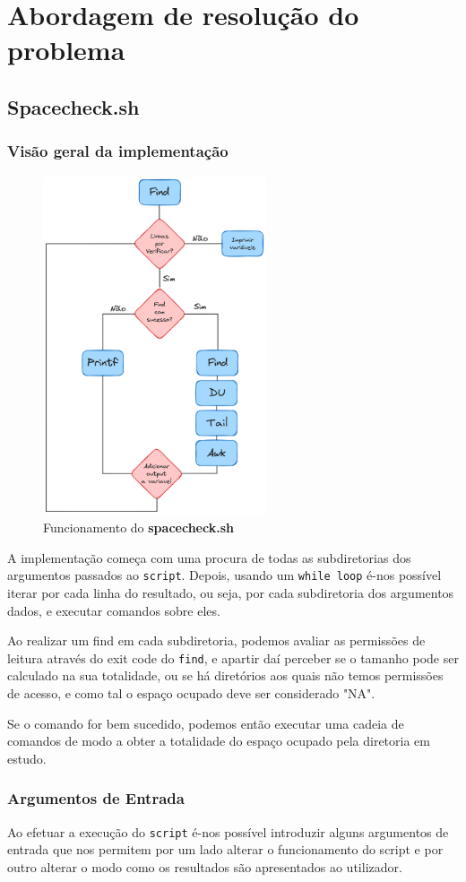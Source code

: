 \chapter{Abordagem de resolução do problema}
\section{Spacecheck.sh}
\subsection{Visão geral da implementação}
\begin{figure}[H]
    \centering
    \includegraphics[height=10cm]{Fluxograma_Implementacao.png}
    \caption{Funcionamento do \textbf{spacecheck.sh}}
\end{figure}
A implementação começa com uma procura de todas as
subdiretorias dos argumentos passados ao \verb|script|.
Depois, usando um \verb|while loop| é-nos possível iterar
por cada linha do resultado, ou seja, por cada subdiretoria
dos argumentos dados, e executar comandos sobre eles.

Ao realizar um find em cada subdiretoria, podemos avaliar as
permissões de leitura através do exit code do \verb|find|,
e apartir daí perceber se o tamanho pode ser calculado na
sua totalidade, ou se há diretórios aos quais não temos
permissões de acesso, e como tal o espaço ocupado deve ser
considerado "NA".

Se o comando for bem sucedido, podemos então executar uma
cadeia de comandos de modo a obter a totalidade do espaço
ocupado pela diretoria em estudo.
\subsection{Argumentos de Entrada}
   Ao efetuar a execução do \verb|script| é-nos possível
   introduzir alguns argumentos de entrada que nos permitem
   por um lado alterar o funcionamento do script e por outro
   alterar o modo como os resultados são apresentados ao
   utilizador.

